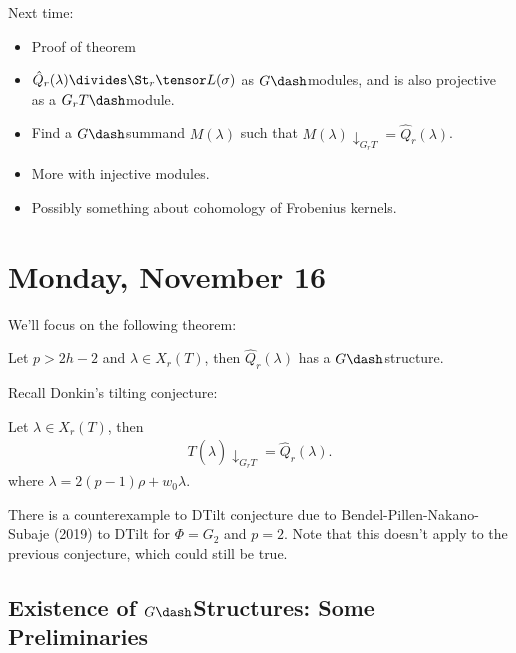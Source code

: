 Next time:

\begin{itemize}
\item
  Proof of theorem
\item
  \(\hat{Q}_r(\lambda) \divides \St_r \tensor L(\sigma)\) as
  \(G\dash\)modules, and is also projective as a \(G_r T\dash\)module.
\item
  Find a \(G\dash\)summand \(M(\lambda)\) such that
  \(M(\lambda)\downarrow_{G_r T} = \hat{Q}_r (\lambda)\).
\item
  More with injective modules.
\item
  Possibly something about cohomology of Frobenius kernels.
\end{itemize}

\hypertarget{monday-november-16}{%
\section{Monday, November 16}\label{monday-november-16}}

We'll focus on the following theorem:

\begin{theorem}

Let \(p> 2h-2\) and \(\lambda\in X_r(T)\), then \(\hat{Q}_r(\lambda)\)
has a \(G\dash\)structure.

\end{theorem}

Recall Donkin's tilting conjecture:

\begin{conjecture}[DTilt]

Let \(\lambda\in X_r(T)\), then
\begin{align*}  
T(\hat{\lambda})\downarrow_{G_r T} = \hat{Q}_r(\lambda)
.\end{align*} where \(\lambda = 2(p-1)\rho + w_0\lambda\).

\end{conjecture}

\begin{remark}

There is a counterexample to DTilt conjecture due to
Bendel-Pillen-Nakano-Subaje (2019) to DTilt for \(\Phi = G_2\) and
\(p=2\). Note that this doesn't apply to the previous conjecture, which
could still be true.

\end{remark}

\hypertarget{existence-of-gdashstructures-some-preliminaries}{%
\subsection{\texorpdfstring{Existence of \(G\dash\)Structures: Some
Preliminaries}{Existence of G\textbackslash dashStructures: Some Preliminaries}}\label{existence-of-gdashstructures-some-preliminaries}}

